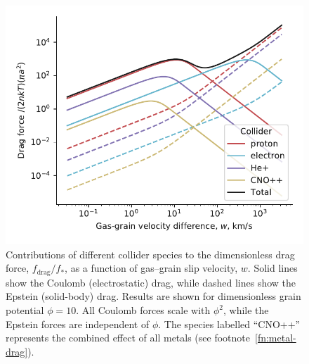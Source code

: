 \message{ !name(dusty-bow-wave.tex)}\documentclass[useAMS, usenatbib, a4paper]{mnras}
\newcommand\drag{\ensuremath{_{\text{drag}}}}
\begin{document}
\begin{figure}
  \includegraphics[width=\linewidth]{figs/test-Fdrag-components}
  \caption{Contributions of different collider species to the
    dimensionless drag force, \(f\drag / f_*\), as a function of
    gas--grain slip velocity, \(w\).  Solid lines show the Coulomb
    (electrostatic) drag, while dashed lines show the Epstein
    (solid-body) drag.  Results are shown for dimensionless grain
    potential \(\phi = 10\).  All Coulomb forces scale with
    \(\phi^2\), while the Epstein forces are independent of \(\phi\).  The
    species labelled ``CNO++'' represents the combined effect of all
    metals (see footnote~\ref{fn:metal-drag}).}
  \label{fig:drag-components}
\end{figure}
\end{document}
